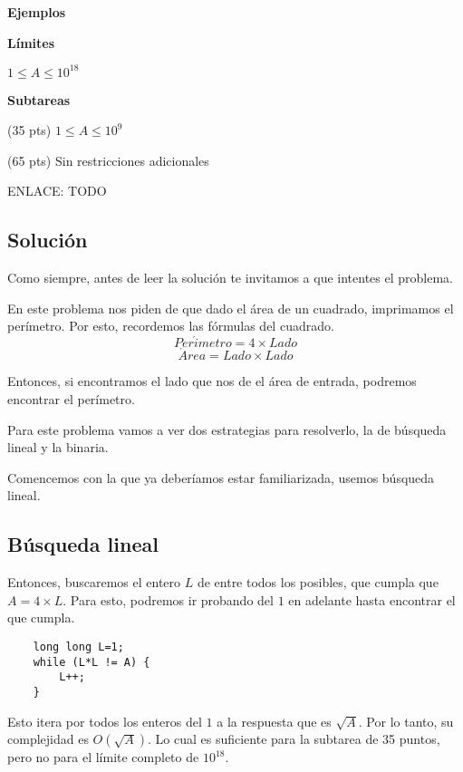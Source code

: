 \textbf{Ejemplos}\\
\begin{casebox2}
\end{casebox2}

\textbf{Límites}
\begin{plimits}
	\item \(1\leq A \leq 10^{18}\)
\end{plimits}

\textbf{Subtareas}
\begin{plimits}
	\item (35 pts) \(1\leq A \leq 10^9\)
	\item (65 pts) Sin restricciones adicionales
\end{plimits}

ENLACE: TODO

\subsection*{Solución}
Como siempre, antes de leer la solución te invitamos a que intentes el problema.

En este problema nos piden de que dado el área de un cuadrado, imprimamos el perímetro. Por esto, recordemos las fórmulas del cuadrado.
\[Per\acute{i}metro=4\times Lado \]
\[\acute{A}rea=Lado\times Lado \]

Entonces, si encontramos el lado que nos de el área de entrada, podremos encontrar el perímetro.

Para este problema vamos a ver dos estrategias para resolverlo, la de búsqueda lineal y la binaria.

Comencemos con la que ya deberíamos estar familiarizada, usemos búsqueda lineal.
\subsection*{Búsqueda lineal}
Entonces, buscaremos el entero \(L\) de entre todos los posibles, que cumpla que \(A=4\times L\). Para esto, podremos ir probando del \(1\) en adelante hasta encontrar el que cumpla.

\begin{lstlisting}
	long long L=1;
	while (L*L != A) {
		L++;
	}
\end{lstlisting}

Esto itera por todos los enteros del \(1\) a la respuesta que es \(\sqrt{A}\). Por lo tanto, su complejidad es \(O(\sqrt{A})\). Lo cual es suficiente para la subtarea de 35 puntos, pero no para el límite completo de \(10^{18}\).

